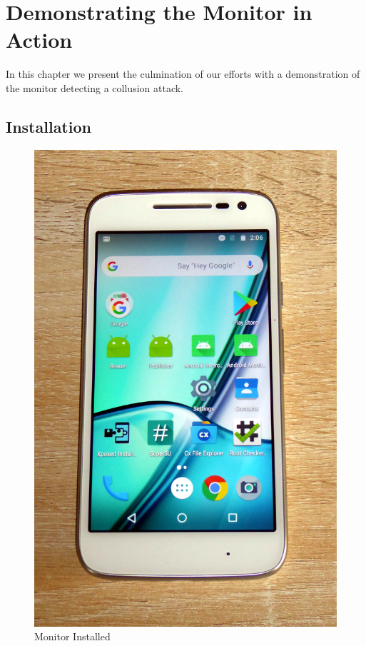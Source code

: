 \chapter{Demonstrating the Monitor in Action}
\label{chap:MonitorInAction}

In this chapter we present the culmination of our efforts with a demonstration of the monitor detecting a collusion attack.

\section{Installation}

\begin{figure}
	\centering
	\vspace{-12pt}
	\includegraphics[height=0.39\textheight]{graphics/PhonePhotos/01 - Installation.jpg}
	\caption{Monitor Installed}
	\label{fig:MonitorInstalled}
\end{figure}

